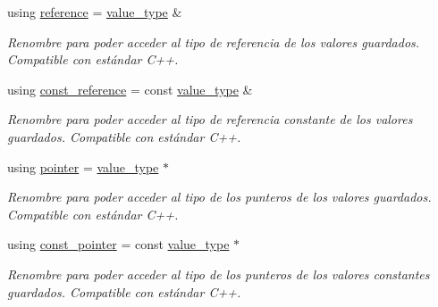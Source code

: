 \begin{DoxyCompactItemize}
using \hyperlink{classaed2_1_1iterator_ad4ba975de35932c0cc8af3c25a6748bf}{reference} = \hyperlink{classaed2_1_1iterator_a6411a2c08b2b7c52f063bef1a168acb6}{value\+\_\+type} \&
\begin{DoxyCompactList}\small\item\em Renombre para poder acceder al tipo de referencia de los valores guardados. Compatible con estándar C++. \end{DoxyCompactList}\item 
\mbox{\label{classaed2_1_1iterator_a84dc2693b11216f8c641b5df59088283}} 
using \hyperlink{classaed2_1_1iterator_a84dc2693b11216f8c641b5df59088283}{const\+\_\+reference} = const \hyperlink{classaed2_1_1iterator_a6411a2c08b2b7c52f063bef1a168acb6}{value\+\_\+type} \&
\begin{DoxyCompactList}\small\item\em Renombre para poder acceder al tipo de referencia constante de los valores guardados. Compatible con estándar C++. \end{DoxyCompactList}\item 
\mbox{\label{classaed2_1_1iterator_a07466e8d020a80e2deb80364f28d4fa0}} 
using \hyperlink{classaed2_1_1iterator_a07466e8d020a80e2deb80364f28d4fa0}{pointer} = \hyperlink{classaed2_1_1iterator_a6411a2c08b2b7c52f063bef1a168acb6}{value\+\_\+type} $\ast$
\begin{DoxyCompactList}\small\item\em Renombre para poder acceder al tipo de los punteros de los valores guardados. Compatible con estándar C++. \end{DoxyCompactList}\item 
\mbox{\label{classaed2_1_1iterator_afa70c9577ce04d4d7b84741fababc5ac}} 
using \hyperlink{classaed2_1_1iterator_afa70c9577ce04d4d7b84741fababc5ac}{const\+\_\+pointer} = const \hyperlink{classaed2_1_1iterator_a6411a2c08b2b7c52f063bef1a168acb6}{value\+\_\+type} $\ast$
\begin{DoxyCompactList}\small\item\em Renombre para poder acceder al tipo de los punteros de los valores constantes guardados. Compatible con estándar C++. \end{DoxyCompactList}\item 
\mbox{\label{classaed2_1_1iterator_a0d460d3f76439cea3436e1113990be47}} 

\end{DoxyCompactItemize}
